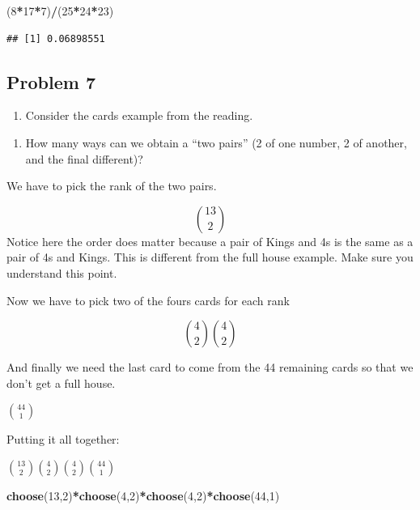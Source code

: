 \documentclass[
]{book}
\newenvironment{Shaded}{\begin{snugshade}}{\end{snugshade}}
\newcommand{\DecValTok}[1]{\textcolor[rgb]{0.00,0.00,0.81}{#1}}
\newcommand{\KeywordTok}[1]{\textcolor[rgb]{0.13,0.29,0.53}{\textbf{#1}}}
\newcommand{\NormalTok}[1]{#1}
\newcommand{\OperatorTok}[1]{\textcolor[rgb]{0.81,0.36,0.00}{\textbf{#1}}}
\providecommand{\tightlist}{%
  \setlength{\itemsep}{0pt}\setlength{\parskip}{0pt}}
\begin{document}
\begin{Shaded}
\begin{Highlighting}[]
\NormalTok{(}\DecValTok{8}\OperatorTok{*}\DecValTok{17}\OperatorTok{*}\DecValTok{7}\NormalTok{)}\OperatorTok{/}\NormalTok{(}\DecValTok{25}\OperatorTok{*}\DecValTok{24}\OperatorTok{*}\DecValTok{23}\NormalTok{)}
\end{Highlighting}
\end{Shaded}

\begin{verbatim}
## [1] 0.06898551
\end{verbatim}

\hypertarget{problem-7}{%
\subsection{Problem 7}\label{problem-7}}

\begin{enumerate}
\def\labelenumi{\arabic{enumi}.}
\setcounter{enumi}{6}
\tightlist
\item
  Consider the cards example from the reading.
\end{enumerate}

\begin{enumerate}
\def\labelenumi{\alph{enumi}.}
\tightlist
\item
  How many ways can we obtain a ``two pairs'' (2 of one number, 2 of another, and the final different)?
\end{enumerate}

We have to pick the rank of the two pairs.

\[\binom{13}{2}\]
Notice here the order does matter because a pair of Kings and 4s is the same as a pair of 4s and Kings. This is different from the full house example. Make sure you understand this point.

Now we have to pick two of the fours cards for each rank

\[\binom{4}{2}\binom{4}{2}\]

And finally we need the last card to come from the 44 remaining cards so that we don't get a full house.

\(\binom{44}{1}\)

Putting it all together:

\(\binom{13}{2}\binom{4}{2}\binom{4}{2}\binom{44}{1}\)

\begin{Shaded}
\begin{Highlighting}[]
\KeywordTok{choose}\NormalTok{(}\DecValTok{13}\NormalTok{,}\DecValTok{2}\NormalTok{)}\OperatorTok{*}\KeywordTok{choose}\NormalTok{(}\DecValTok{4}\NormalTok{,}\DecValTok{2}\NormalTok{)}\OperatorTok{*}\KeywordTok{choose}\NormalTok{(}\DecValTok{4}\NormalTok{,}\DecValTok{2}\NormalTok{)}\OperatorTok{*}\KeywordTok{choose}\NormalTok{(}\DecValTok{44}\NormalTok{,}\DecValTok{1}\NormalTok{)}
\end{Highlighting}
\end{Shaded}
\end{document}
